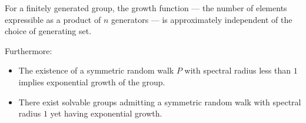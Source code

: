 For a finitely generated group, the growth function --- the number of elements expressible as a product of $n$ generators --- is approximately independent of the choice of generating set.

Furthermore:
\begin{itemize}
\item The existence of a symmetric random walk $P$ with spectral radius less than $1$ implies exponential growth of the group.
\item There exist solvable groups admitting a symmetric random walk with spectral radius $1$ yet having exponential growth.
\end{itemize}
